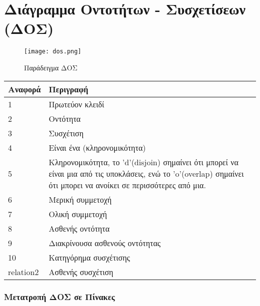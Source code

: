 \section{Διάγραμμα Οντοτήτων - Συσχετίσεων (ΔΟΣ)}

\begin{figure}[ht!]
	\centering
	\texttt{[image: dos.png]}
	\caption{Παράδειγμα ΔΟΣ}
\end{figure}

\begin{tabularx}{0.9\textwidth}{|X|X|}
	\hline
	{Αναφορά} & {Περιγραφή} \\
	\hline
	{1} & {Πρωτεύον κλειδί} \\
	\hline
	{2} & {Οντότητα} \\
	\hline
	{3} & {Συσχέτιση} \\
	\hline
	{4} & {Είναι ένα (κληρονομικότητα)} \\
	\hline
	{5} & {Κληρονομικότητα, το 'd'(disjoin)  σημαίνει ότι μπορεί να είναι μια από τις υποκλάσεις,
		ενώ το 'o'(overlap) σημαίνει ότι μπορει να ανοίκει σε περισσότερες από μια.} \\
	\hline
	{6} & {Μερική συμμετοχή} \\
	\hline
	{7} & {Ολική συμμετοχή} \\
	\hline
	{8} & {Ασθενής οντότητα} \\
	\hline
	{9} & {Διακρίνουσα ασθενούς οντότητας} \\
	\hline
	{10} & {Κατηγόρημα συσχέτισης} \\
	\hline
	{relation2} & {Ασθενής συσχέτιση} \\
	\hline
\end{tabularx}

\subsubsection{Μετατροπή ΔΟΣ σε Πίνακες}


